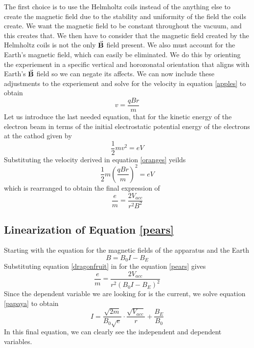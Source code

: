 \documentclass[aps,prl,10pt,twocolumn,floatfix]{revtex4-2}
\begin{document}
The first choice is to use the Helmholtz coils instead of the anything else to create the magnetic field due to the stability and uniformity of the field the coils create. 
We want the magnetic field to be constant throughout the vacuum, and this creates that. 
We then have to consider that the magnetic field created by the Helmholtz coils is not the only $\va{B}$ field present.
We also must account for the Earth's magnetic field, which can easily be eliminated. 
We do this by orienting the experiement in a specific vertical and horozonatal orientation that aligns with Earth's $\va{B}$ field so we can negate its affects. 
We can now include these adjustments to the experiement and solve for the velocity in equation \ref{apples} to obtain
\begin{equation}\label{oranges}
v=\frac{qBr}{m}
\end{equation}
Let us introduce the last needed equation, that for the kinetic energy of the electron beam in terms of the initial electrostatic potential energy of the electrons at the cathod given by
\begin{equation}
\frac{1}{2}mv^2=eV
\end{equation}
Substituting the velocity derived in equation \ref{oranges} yeilds
\begin{equation*}
\frac{1}{2}m(\frac{qBr}{m})^2=eV
\end{equation*}
which is rearranged to obtain the final expression of
\begin{equation}\label{blueberries}
\frac{e}{m}=\frac{2V_{acc}}{r^2B^2}
\end{equation}

\subsection{Linearization of Equation \ref{pears}}
Starting with the equation for the magnetic fields of the apparatus and the Earth
\begin{equation}\label{dragonfruit}
B=B_0I-B_E
\end{equation}
Substituting equation \ref{dragonfruit} in for the equation \ref{pears} gives
\begin{equation*}\label{papaya}
\frac{e}{m}=\frac{2V_{acc}}{r^2(B_0I-B_E)^2}
\end{equation*}
Since the dependent variable we are looking for is the current, we  solve equation \ref{papaya} to obtain
\begin{equation}
I=\frac{\sqrt{2m}}{B_0\sqrt{e}}\cdot \frac{\sqrt{V_{acc}}}{r}+\frac{B_E}{B_0}
\end{equation}
In this final equation, we can clearly see the independent and dependent variables.
\end{document}
